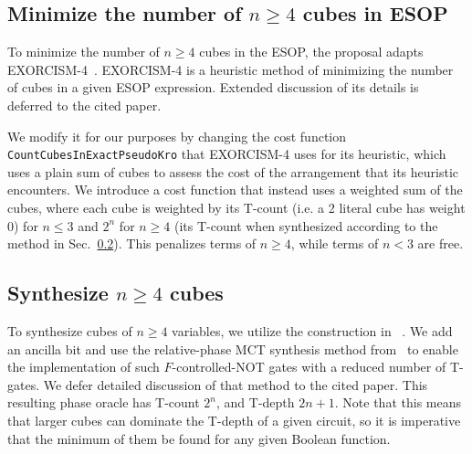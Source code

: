 \subsection{Minimize the number of $n \geq 4$ cubes in ESOP}
\label{Pro:Minimize}

To minimize the number of $n \geq 4$ cubes in the ESOP, the proposal adapts EXORCISM-4~\cite{bib-exorcism}.
EXORCISM-4 is a heuristic method of minimizing the number of cubes in a given ESOP expression. Extended
discussion of its details is deferred to the cited paper. 

We modify it for our purposes by changing
the cost function \texttt{CountCubesInExactPseudoKro} that EXORCISM-4 uses for its heuristic, which uses a plain sum
of cubes to assess the cost of the arrangement that its heuristic encounters. We introduce a cost function
that instead uses a weighted sum of the cubes, where each cube is weighted by its T-count (i.e. a 2 literal cube
has weight 0) for $n \leq 3$ and $2^n$ for $n \geq 4$ (its T-count when synthesized according to the method in
Sec.~\ref{Pro:n4}). This penalizes terms of $n \geq 4$, while terms of $n < 3$ are free.


\subsection{Synthesize $n \geq 4$ cubes}
\label{Pro:n4}

To synthesize cubes of $n \geq 4$ variables, we utilize the construction in ~. We add an
ancilla bit and use the relative-phase MCT synthesis method from~\cite{bib-rtof-maslov} to enable the
implementation of such $F$-controlled-NOT gates with a reduced number of T-gates. We defer detailed
discussion of that method to the cited paper. This resulting phase oracle has T-count $2^{n}$, and
T-depth $2n+1$. Note that this means that larger cubes can dominate the T-depth of a given circuit, so it is
imperative that the minimum of them be found for
any given Boolean function.





